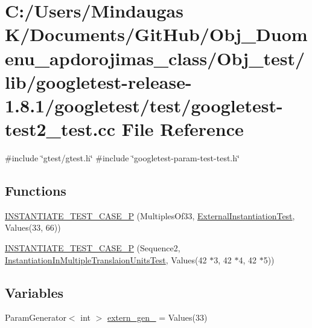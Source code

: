 \hypertarget{_obj__test_2lib_2googletest-release-1_88_81_2googletest_2test_2googletest-test2__test_8cc}{}\section{C\+:/\+Users/\+Mindaugas K/\+Documents/\+Git\+Hub/\+Obj\+\_\+\+Duomenu\+\_\+apdorojimas\+\_\+class/\+Obj\+\_\+test/lib/googletest-\/release-\/1.8.1/googletest/test/googletest-\/test2\+\_\+test.cc File Reference}
\label{_obj__test_2lib_2googletest-release-1_88_81_2googletest_2test_2googletest-test2__test_8cc}
{\ttfamily \#include \char`\"{}gtest/gtest.\+h\char`\"{}}\newline
{\ttfamily \#include \char`\"{}googletest-\/param-\/test-\/test.\+h\char`\"{}}\newline
\subsection*{Functions}
\begin{DoxyCompactItemize}
\item 
\mbox{\hyperlink{_obj__test_2lib_2googletest-release-1_88_81_2googletest_2test_2googletest-test2__test_8cc_a433ad86af147648bc394f0f37016f336}{I\+N\+S\+T\+A\+N\+T\+I\+A\+T\+E\+\_\+\+T\+E\+S\+T\+\_\+\+C\+A\+S\+E\+\_\+P}} (Multiples\+Of33, \mbox{\hyperlink{class_external_instantiation_test}{External\+Instantiation\+Test}}, Values(33, 66))
\item 
\mbox{\hyperlink{_obj__test_2lib_2googletest-release-1_88_81_2googletest_2test_2googletest-test2__test_8cc_a06b097d2f2746a785ab07df0cc2e80a2}{I\+N\+S\+T\+A\+N\+T\+I\+A\+T\+E\+\_\+\+T\+E\+S\+T\+\_\+\+C\+A\+S\+E\+\_\+P}} (Sequence2, \mbox{\hyperlink{class_instantiation_in_multiple_translaion_units_test}{Instantiation\+In\+Multiple\+Translaion\+Units\+Test}}, Values(42 $\ast$3, 42 $\ast$4, 42 $\ast$5))
\end{DoxyCompactItemize}
\subsection*{Variables}
\begin{DoxyCompactItemize}
\item 
Param\+Generator$<$ int $>$ \mbox{\hyperlink{_obj__test_2lib_2googletest-release-1_88_81_2googletest_2test_2googletest-test2__test_8cc_a4c9bff52d70a57c0563599a919c33bc9}{extern\+\_\+gen\+\_}} = Values(33)
\end{DoxyCompactItemize}


